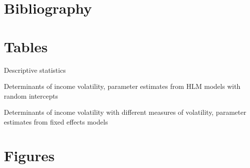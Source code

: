 \documentclass[12pt]{article}
\begin{document}

\clearpage
\singlespacing
\section{Bibliography}
\renewcommand*{\refname}{\vspace*{-12mm}} 



\clearpage
\section{Tables}

\begin{table}[htp!]
\centering
\caption{Descriptive statistics} 
\centering
\resizebox{\textwidth}{!}{}
\label{descriptives}
\end{table}

\begin{table}[!ht]
\caption{Determinants of income volatility, parameter estimates from HLM models with random intercepts}
\begin{center}
\resizebox{\textwidth}{!}{}
\label{mixed}
\end{center}
\end{table}

\begin{sidewaystable}[!ht]
\caption{Determinants of income volatility with different measures of volatility, parameter estimates from fixed effects models}
\begin{center}
\resizebox{\textwidth}{!}{}
\label{regression}
\end{center}
\end{sidewaystable}

\clearpage
\section{Figures}
\end{document}
